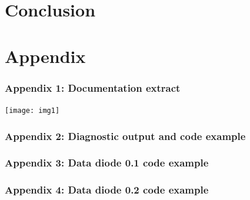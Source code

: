\documentclass[a4paper, 12pt]{book}
\begin{document}
\chapter{Conclusion}



\chapter{Appendix}
\subsection{Appendix 1: Documentation extract}
\texttt{[image: img1]}
\pagebreak
\subsection{Appendix 2: Diagnostic output and code example}



\pagebreak
\subsection{Appendix 3: Data diode 0.1 code example}


\pagebreak
\subsection{Appendix 4: Data diode 0.2 code example}


\end{document}
